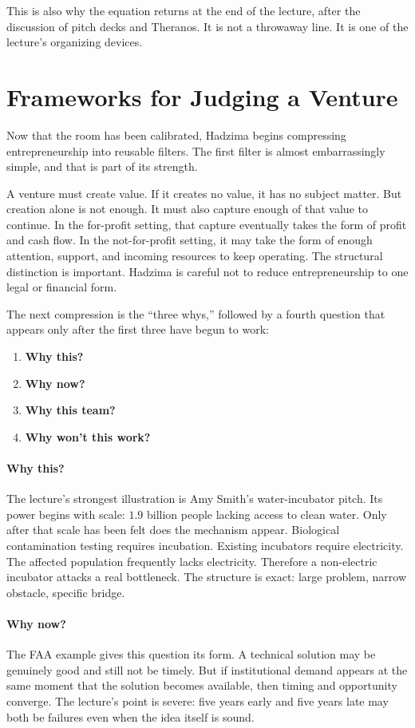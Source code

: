 This is also why the equation returns at the end of the lecture, after the discussion of pitch decks and Theranos. It is not a throwaway line. It is one of the lecture's organizing devices.

\section{Frameworks for Judging a Venture}

Now that the room has been calibrated, Hadzima begins compressing entrepreneurship into reusable filters. The first filter is almost embarrassingly simple, and that is part of its strength.

A venture must create value. If it creates no value, it has no subject matter. But creation alone is not enough. It must also capture enough of that value to continue. In the for-profit setting, that capture eventually takes the form of profit and cash flow. In the not-for-profit setting, it may take the form of enough attention, support, and incoming resources to keep operating. The structural distinction is important. Hadzima is careful not to reduce entrepreneurship to one legal or financial form.

The next compression is the ``three whys,'' followed by a fourth question that appears only after the first three have begun to work:
\begin{enumerate}
  \item \textbf{Why this?}
  \item \textbf{Why now?}
  \item \textbf{Why this team?}
  \item \textbf{Why won't this work?}
\end{enumerate}

\paragraph{Why this?} The lecture's strongest illustration is Amy Smith's water-incubator pitch. Its power begins with scale: \(1.9\) billion people lacking access to clean water. Only after that scale has been felt does the mechanism appear. Biological contamination testing requires incubation. Existing incubators require electricity. The affected population frequently lacks electricity. Therefore a non-electric incubator attacks a real bottleneck. The structure is exact: large problem, narrow obstacle, specific bridge.

\paragraph{Why now?} The FAA example gives this question its form. A technical solution may be genuinely good and still not be timely. But if institutional demand appears at the same moment that the solution becomes available, then timing and opportunity converge. The lecture's point is severe: five years early and five years late may both be failures even when the idea itself is sound.

